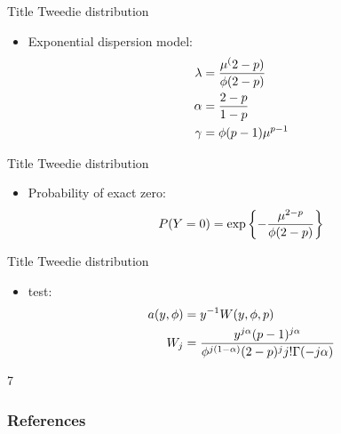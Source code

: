 \documentclass[12pt,t]{beamer}
\newcommand{\subt}[1]{{\footnotesize \color{subtitle} {#1}}}
\begin{document}
\begin{frame}{Title}
\subt{Tweedie distribution}
\bigskip

\begin{itemize}
  \item Exponential dispersion model:
    \begin{align}
        \lambda &= \frac{\mu^(2-p)}{\phi (2-p)} \notag \\
        \alpha &= \frac{2-p}{1-p} \notag \\
        \gamma &= \phi(p-1)\mu^{p-1} \notag
    \end{align}
\end{itemize}

\end{frame}





\begin{frame}{Title}
\subt{Tweedie distribution}
\bigskip

\begin{itemize}
  \item Probability of exact zero:
    \begin{align}
        P(Y=0) = \exp \left\{ -\frac{\mu^{2-p}}{\phi (2-p)} \right\} \notag
    \end{align}
\end{itemize}

\end{frame}






\begin{frame}{Title}
\subt{Tweedie distribution}
\bigskip

\begin{itemize}
  \item test:
    \begin{align}
        a(y,\phi) &= y^{-1} W(y,\phi, p) \notag \\
        W_j &= \frac{y^{j\alpha}(p-1)^{j\alpha}}{\phi^{j(1-\alpha)}(2-p)^j j! \Gamma(-j\alpha)} \notag
    \end{align}
\end{itemize}

\end{frame}




7

\begin{frame}[allowframebreaks]
\frametitle{References}


\end{frame}
\end{document}
